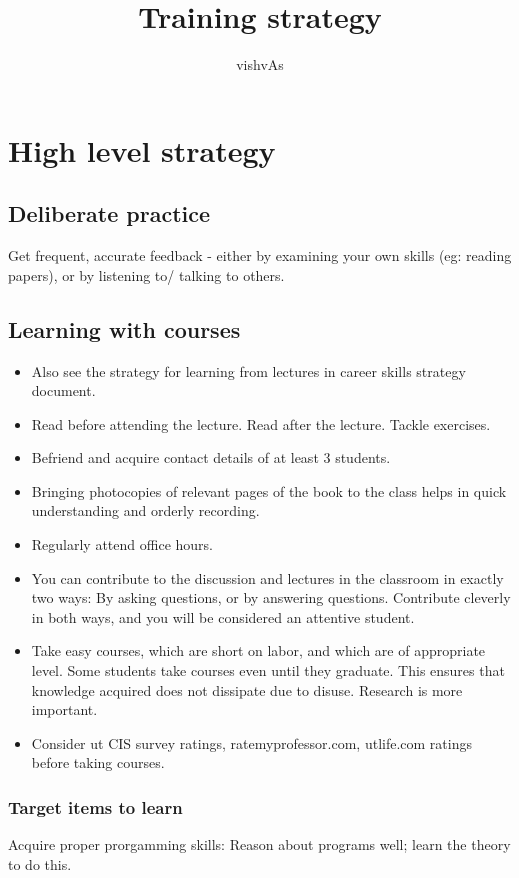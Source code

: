 \documentclass[oneside, article]{memoir}
\title{Training strategy}
\author{vishvAs}
\begin{document}
\maketitle


\chapter{High level strategy}
\section{Deliberate practice}
Get frequent, accurate feedback - either by examining your own skills (eg: reading papers), or by listening to/ talking to others.

\section{Learning with courses}
\begin{itemize}
\item Also see the strategy for learning from lectures in career skills strategy document.
\item Read before attending the lecture. Read after the lecture. Tackle exercises.
\item Befriend and acquire contact details of at least 3 students.
\item Bringing photocopies of relevant pages of the book to the class helps in quick understanding and orderly recording.
\item Regularly attend office hours.
\item You can contribute to the discussion and lectures in the classroom in exactly two ways: By asking questions, or by answering questions. Contribute cleverly in both ways, and you will be considered an attentive student.
\item Take easy courses, which are short on labor, and which are of appropriate level. Some students take courses even until they graduate. This ensures that knowledge acquired does not dissipate due to disuse. Research is more important.
\item Consider ut CIS survey ratings, ratemyprofessor.com, utlife.com ratings before taking courses.
\end{itemize}

\subsection{Target items to learn}
Acquire proper prorgamming skills: Reason about programs well; learn the theory to do this.
\end{document}
